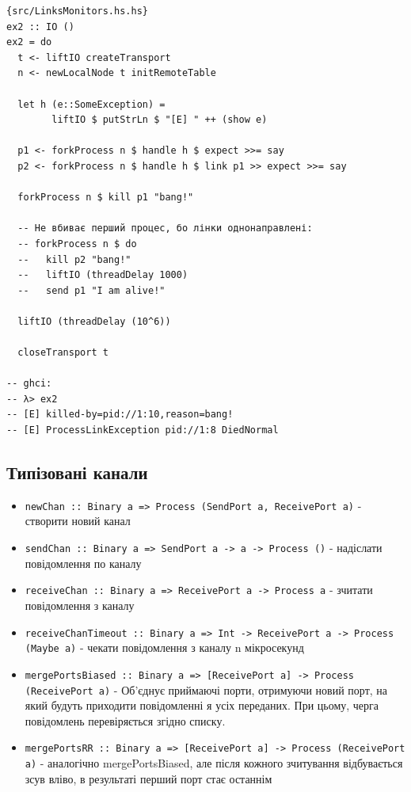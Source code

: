 \documentclass[12pt]{article}
\begin{document}
\begin{lstlisting}{src/LinksMonitors.hs.hs}
ex2 :: IO ()
ex2 = do
  t <- liftIO createTransport
  n <- newLocalNode t initRemoteTable

  let h (e::SomeException) =
        liftIO $ putStrLn $ "[E] " ++ (show e)
  
  p1 <- forkProcess n $ handle h $ expect >>= say  
  p2 <- forkProcess n $ handle h $ link p1 >> expect >>= say

  forkProcess n $ kill p1 "bang!"

  -- Не вбиває перший процес, бо лінки однонаправлені:
  -- forkProcess n $ do
  --   kill p2 "bang!"
  --   liftIO (threadDelay 1000)
  --   send p1 "I am alive!"
  
  liftIO (threadDelay (10^6))
  
  closeTransport t
  
-- ghci:
-- λ> ex2
-- [E] killed-by=pid://1:10,reason=bang!
-- [E] ProcessLinkException pid://1:8 DiedNormal
\end{lstlisting}



\subsection{Типізовані канали}

\begin{itemize}
    \item \lstinline{newChan :: Binary a => Process (SendPort a, ReceivePort a)} - створити новий канал
    \item \lstinline{sendChan :: Binary a => SendPort a -> a -> Process ()} - надіслати повідомлення по каналу
    \item \lstinline{receiveChan :: Binary a => ReceivePort a -> Process a} - зчитати повідомлення з каналу
    \item \lstinline{receiveChanTimeout :: Binary a => Int -> ReceivePort a -> Process (Maybe a)} - чекати повідомлення з каналу n мікросекунд
    \item \lstinline{mergePortsBiased :: Binary a => [ReceivePort a] -> Process (ReceivePort a)} - Об'єднує приймаючі порти, отримуючи новий порт, на який будуть приходити повідомленні я усіх переданих. При цьому, черга повідомлень перевіряється згідно списку.
    \item \lstinline{mergePortsRR :: Binary a => [ReceivePort a] -> Process (ReceivePort a)} - аналогічно mergePortsBiased, але після кожного зчитування відбувається зсув вліво, в результаті перший порт стає останнім
\end{itemize}
\end{document}

